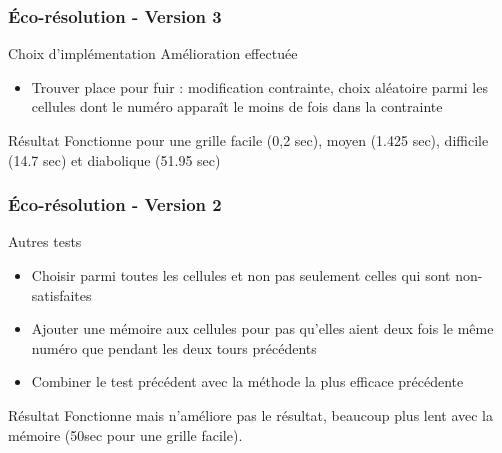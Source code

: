 \begin{frame}
    \frametitle{Éco-résolution - Version 3}
    \begin{block}{Choix d'implémentation}
    		Amélioration effectuée
    		\begin{itemize}
    			\item Trouver place pour fuir : modification contrainte, choix aléatoire parmi les cellules dont le numéro apparaît le moins de fois dans la contrainte
    		\end{itemize}
    \end{block}
    \pause
    \begin{alertblock}{Résultat}
    		Fonctionne pour une grille facile (0,2 sec), moyen (1.425 sec), difficile (14.7 sec) et diabolique (51.95 sec)
    \end{alertblock}
\end{frame}


\begin{frame}
    \frametitle{Éco-résolution - Version 2}
    \begin{exampleblock}{Autres tests}
   		 \begin{itemize}
    				\item Choisir parmi toutes les cellules et non pas seulement celles qui sont non-satisfaites
    		 \pause
    				\item Ajouter une mémoire aux cellules pour pas qu'elles aient deux fois le même numéro que pendant les deux tours précédents 
		 \pause
				\item Combiner le test précédent avec la méthode la plus efficace précédente
		 \end{itemize}
	\end{exampleblock}
	\pause
	\begin{alertblock}{Résultat}
		Fonctionne mais n'améliore pas le résultat, beaucoup plus lent avec la mémoire (50sec pour une grille facile).
    \end{alertblock}
\end{frame}